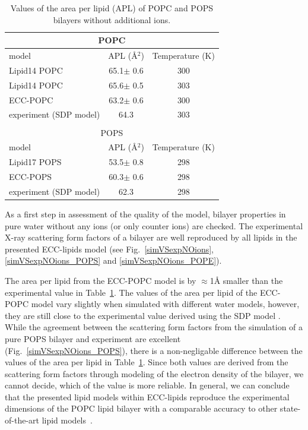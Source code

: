 \begin{table}[tb!] 
  \caption{Values of the area per lipid (APL) of POPC and POPS bilayers without additional ions. \label{tab:apls} 
  } 
  \begin{tabular}{l|c c} 
    \multicolumn{3}{c}{POPC} \\
    \hline 
    model          & APL (Å$^2$)   & Temperature (K) \\ 
    \hline 
    Lipid14 POPC                    & 65.1$\pm$ 0.6  &  300 \\ 
    Lipid14 POPC \citep{dickson14}  & 65.6$\pm$ 0.5  &  303 \\ 
    \hline 
    ECC-POPC                & 63.2$\pm$ 0.6  &  300       \\ 
    \hline 
    experiment (SDP model) \citep{kucerka11} & 64.3  &  303    \\ 
    \hline 
    \\
    \multicolumn{3}{c}{POPS} \\
    \hline 
    model          & APL (Å$^2$)   & Temperature (K) \\ 
    \hline 
    Lipid17 POPS              & 53.5$\pm$ 0.8  &  298 \\ 
    \hline 
    ECC-POPS                & 60.3$\pm$ 0.6  &  298       \\ 
    \hline 
    experiment (SDP model) \cite{SDP-CHARMM36_comparison_paper_Samuli-knows} & 62.3  &  298    \\ 
    \hline 
  \end{tabular} 
\end{table} 
 
 
As a first step in assessment of the quality of the model, 
bilayer properties in pure water without any ions (or only counter ions) are checked. 
The experimental X-ray scattering form factors 
of a bilayer are well reproduced by all lipids in the presented ECC-lipids model 
(see Fig.~\ref{simVSexpNOions}, \ref{simVSexpNOions_POPS} and \ref{simVSexpNOions_POPE}). 

The area per lipid from the ECC-POPC model is by $\approx$1Å smaller 
than the experimental value in Table~\ref{tab:apls}. 
The values of the area per lipid of the ECC-POPC model vary slightly 
when simulated with different water models, however,
they are still close to the experimental value derived using the SDP model \citep{SDP-CHARMM36_comparison_paper_Samuli-knows}. 
While the agreement between the scattering form factors 
from the simulation of a pure POPS bilayer and experiment 
are excellent (Fig.~\ref{simVSexpNOions_POPS}),
there is a non-negligable difference between the values of the area per lipid in Table~\ref{tab:apls}. 
Since both values are derived from the scattering form factors through modeling of the electron density of the bilayer,
we cannot decide, which of the value is more reliable. 
In general, we can conclude that the presented lipid models within ECC-lipids reproduce the experimental dimensions of the POPC 
lipid bilayer with a comparable accuracy to other state-of-the-art lipid models~\citep{ollila16}. 
 
